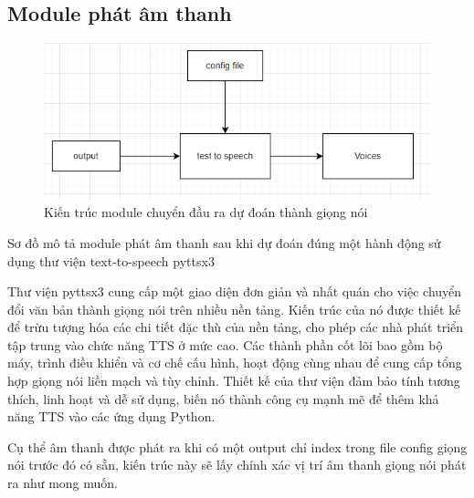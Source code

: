 \subsection{Module phát âm thanh}
\begin{figure}[H]
    \centering
    \includegraphics[width=\textwidth,height=\textheight,keepaspectratio]{Images/Theoretical basis/test2speech.png}
    \caption{Kiến trúc module chuyển đầu ra dự đoán thành giọng nói}
    \label{fig:enter-label}
\end{figure}

Sơ đồ mô tả module phát âm thanh sau khi dự đoán đúng một hành động sử dụng thư viện text-to-speech pyttsx3

Thư viện pyttsx3 cung cấp một giao diện đơn giản và nhất quán cho việc chuyển đổi văn bản thành giọng nói trên nhiều nền tảng. Kiến trúc của nó được thiết kế để trừu tượng hóa các chi tiết đặc thù của nền tảng, cho phép các nhà phát triển tập trung vào chức năng TTS ở mức cao. Các thành phần cốt lõi bao gồm bộ máy, trình điều khiển và cơ chế cấu hình, hoạt động cùng nhau để cung cấp tổng hợp giọng nói liền mạch và tùy chỉnh. Thiết kế của thư viện đảm bảo tính tương thích, linh hoạt và dễ sử dụng, biến nó thành công cụ mạnh mẽ để thêm khả năng TTS vào các ứng dụng Python.

Cụ thể âm thanh được phát ra khi có một output chỉ index trong file config giọng nói trước đó có sẵn, kiến trúc này sẽ lấy chính xác vị trí âm thanh giọng nói phát ra như mong muốn.